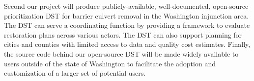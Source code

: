 \documentclass[12pt]{elsarticle}
\begin{document}
Second our project will produce publicly-available, well-documented, open-source prioritization DST for barrier culvert removal in the Washington injunction area. The DST can serve a coordinating function by providing a framework to evaluate restoration plans across various actors. The DST can also support planning for cities and counties with limited access to data and quality cost estimates. Finally, the source code behind our open-source DST will be made widely available to users outside of the state of Washington to facilitate the adoption and customization of a larger set of potential users. 


\end{document}
